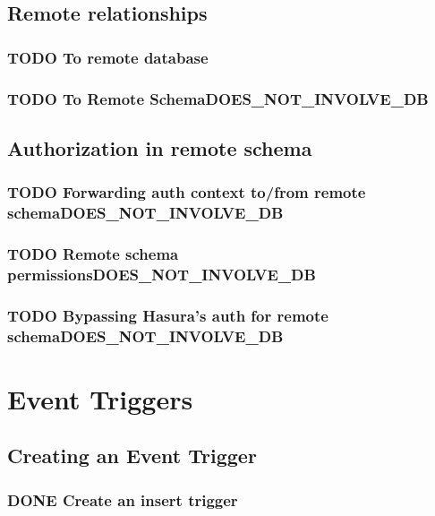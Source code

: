 \documentclass[11pt]{article}
\begin{document}
\subsection{Remote relationships}
\label{sec:org62754fe}
\subsubsection{{\bfseries\sffamily TODO} To remote database}
\label{sec:org415c76d}
\subsubsection{{\bfseries\sffamily TODO} To Remote Schema\hfill{}\textsc{DOES\_NOT\_INVOLVE\_DB}}
\label{sec:orge9a1cfc}
\subsection{Authorization in remote schema}
\label{sec:org1110818}
\subsubsection{{\bfseries\sffamily TODO} Forwarding auth context to/from remote schema\hfill{}\textsc{DOES\_NOT\_INVOLVE\_DB}}
\label{sec:orgf2226b7}
\subsubsection{{\bfseries\sffamily TODO} Remote schema permissions\hfill{}\textsc{DOES\_NOT\_INVOLVE\_DB}}
\label{sec:org211ab7c}
\subsubsection{{\bfseries\sffamily TODO} Bypassing Hasura's auth for remote schema\hfill{}\textsc{DOES\_NOT\_INVOLVE\_DB}}
\label{sec:org10f91f5}
\section{Event Triggers}
\label{sec:org89b1537}
\subsection{Creating an Event Trigger}
\label{sec:org9c9293c}
\subsubsection{{\bfseries\sffamily DONE} Create an insert trigger}
\label{sec:orgb6b7479}
\end{document}
